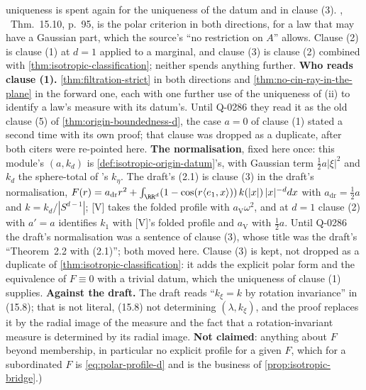 \begin{proposition}
{uniqueness is spent again for the uniqueness of the datum and in clause (3). ,
~Thm.~15.10, p.~95, is the polar criterion in both directions, for a law that
may have a Gaussian part, which the source's ``no restriction on $A$'' allows. Clause (2) is
clause (1) at $d = 1$ applied to a marginal, and clause (3) is clause (2) combined with
\ref{thm:isotropic-classification}; neither spends anything further. \textbf{Who reads clause
(1).} \ref{thm:filtration-strict} in both directions and \ref{thm:no-cin-ray-in-the-plane} in the
forward one, each with one further use of the uniqueness of (ii) to identify a law's
\Levy{} measure with its datum's. Until Q-0286 they read it as the old clause (5) of
\ref{thm:origin-boundedness-d}, the case $a = 0$ of clause (1) stated a second time with its own proof; that clause was dropped as a
duplicate, after both citers were re-pointed here. \textbf{The normalisation}, fixed here once: this
module's $(a, k_d)$ is \ref{def:isotropic-origin-datum}'s, with Gaussian term
$\tfrac12 a|\xi|^2$ and $k_d$ the sphere-total of 's $k_\eta$. The draft's
(2.1) is clause (3) in the draft's normalisation,
$F(r) = a_{\mathrm{dr}}r^2 + \int_{\RR^d}(1 - \cos(r\langle e_1,x\rangle))\,k(|x|)\,|x|^{-d}dx$
with $a_{\mathrm{dr}} = \tfrac12 a$ and $k = k_d/|S^{d-1}|$; [V] takes the folded profile with
$a_{\mathrm V}\omega^2$, and at $d = 1$ clause (2) with $a' = a$ identifies $k_1$ with [V]'s folded
profile and $a_{\mathrm V}$ with $\tfrac12 a$. Until Q-0286 the draft's normalisation was a sentence
of clause (3), whose title was the draft's ``Theorem~2.2 with (2.1)''; both moved here. Clause (3)
is kept, not dropped as a duplicate of \ref{thm:isotropic-classification}: it adds the explicit
polar form and the equivalence of $F \equiv 0$ with a trivial datum, which the uniqueness of
clause (1) supplies. \textbf{Against the draft.} The draft reads ``$k_\xi = k$ by rotation
invariance'' in (15.8); that is not literal, (15.8) not determining $(\lambda,k_\xi)$, and the
proof replaces it by the radial image of the \Levy{} measure and the fact that a
rotation-invariant measure is determined by its radial image. \textbf{Not claimed}: anything about $F$ beyond
membership, in particular no explicit profile for a given $F$, which for a subordinated $F$ is
\ref{eq:polar-profile-d} and is the business of \ref{prop:isotropic-bridge}.)}
\end{proposition}

